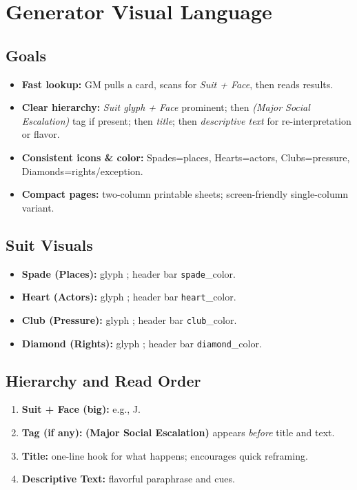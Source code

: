 
\section*{Generator Visual Language}
\subsection*{Goals}
\begin{itemize}
\item \textbf{Fast lookup:} GM pulls a card, scans for \emph{Suit + Face}, then reads results.
\item \textbf{Clear hierarchy:} \emph{Suit glyph + Face} prominent; then \emph{(Major Social Escalation)} tag if present; then \emph{title}; then \emph{descriptive text} for re-interpretation or flavor.
\item \textbf{Consistent icons & color:} Spades=places, Hearts=actors, Clubs=pressure, Diamonds=rights/exception.
\item \textbf{Compact pages:} two-column printable sheets; screen-friendly single-column variant.
\end{itemize}

\subsection*{Suit Visuals}
\begin{itemize}
\item \textbf{Spade (Places):} \color{black} glyph \SuitSpade{}; header bar \texttt{spade}_color.
\item \textbf{Heart (Actors):} \color{red} glyph \SuitHeart{}; header bar \texttt{heart}_color.
\item \textbf{Club (Pressure):} \color{green!40!black} glyph \SuitClub{}; header bar \texttt{club}_color.
\item \textbf{Diamond (Rights):} \color{orange!70!black} glyph \SuitDiamond{}; header bar \texttt{diamond}_color.
\end{itemize}

\subsection*{Hierarchy and Read Order}
\begin{enumerate}
\item \textbf{Suit + Face (big):} e.g., \SuitSpade{} \Large J.
\item \textbf{Tag (if any):} \textbf{(Major Social Escalation)} appears \emph{before} title and text.
\item \textbf{Title:} one-line hook for what happens; encourages quick reframing.
\item \textbf{Descriptive Text:} flavorful paraphrase and cues.
\end{enumerate}

